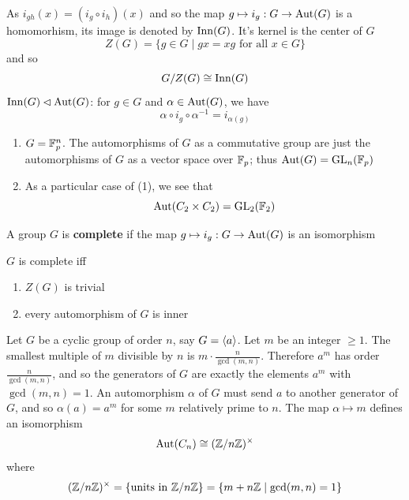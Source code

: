 \documentclass[11pt]{article}
\begin{document}
As \(i_{gh}(x)=(i_g\circ i_h)(x)\) and so the map \(g\mapsto i_g:G\to\operatorname{\text{Aut}}(G)\) is a homomorhism, its image
is denoted by \(\operatorname{Inn}(G)\). It's kernel is the center of \(G\)
\begin{equation*}
Z(G)=\{g\in G\mid gx=xg\text{ for all }x\in G\}
\end{equation*}
and so
\begin{equation*}
G/Z(G)\cong\operatorname{Inn}(G)
\end{equation*}
\(\operatorname{Inn}(G)\lhd\operatorname{\text{Aut}}(G)\): for \(g\in G\) and \(\alpha\in\operatorname{\text{Aut}}(G)\), we have
\begin{equation*}
\alpha\circ i_g\circ\alpha^{-1}=i_{\alpha(g)}
\end{equation*}
\begin{examplle}[]
\begin{enumerate}
\item \(G=\mathbb{F}_p^n\). The automorphisms of \(G\) as a commutative group are just the automorphisms
of \(G\) as a vector space over \(\mathbb{F}_p\); thus \(\operatorname{\text{Aut}}(G)=\operatorname{GL}_n(\mathbb{F}_p)\)
\item As a particular case of (1), we see that
\begin{equation*}
\operatorname{\text{Aut}}(C_2\times C_2)=\operatorname{GL}_2(\mathbb{F}_2)
\end{equation*}
\end{enumerate}
\end{examplle}

\begin{definition}[]
A group \(G\) is \textbf{complete} if the map \(g\mapsto i_g:G\to\operatorname{\text{Aut}}(G)\) is an isomorphism
\end{definition}

\(G\) is complete iff
\begin{enumerate}
\item \(Z(G)\) is trivial
\item every automorphism of \(G\) is inner
\end{enumerate}


Let \(G\) be a cyclic group of order \(n\), say \(G=\langle a\rangle\). Let \(m\) be an integer \(\ge 1\). The
smallest multiple of \(m\) divisible by \(n\) is \(m\cdot\frac{n}{\gcd(m,n)}\). Therefore \(a^m\) has
order \(\frac{n}{\gcd(m,n)}\), and so the generators of \(G\) are exactly the elements \(a^m\)
with \(\gcd(m,n)=1\). An automorphism \(\alpha\) of \(G\) must send \(a\) to another generator of \(G\),
and so \(\alpha(a)=a^m\) for some \(m\) relatively prime to \(n\). The map \(\alpha\mapsto m\) defines an
isomorphism
\begin{equation*}
\operatorname{\text{Aut}}(C_n)\cong(\mathbb{Z}/n\mathbb{Z})^{\times}
\end{equation*}
where
\begin{equation*}
(\mathbb{Z}/n\mathbb{Z})^{\times}=\{\text{units in }\mathbb{Z}/n\mathbb{Z}\}=\{m+n\mathbb{Z}\mid\gcd(m,n)=1\}
\end{equation*}
\end{document}
